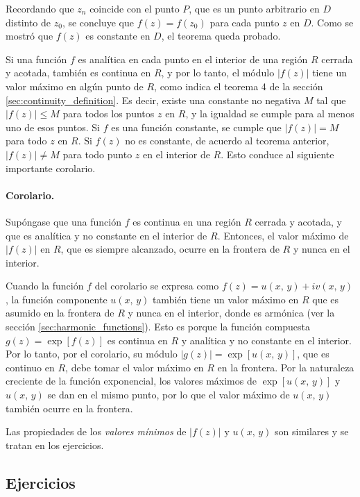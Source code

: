 \documentclass[a4paper]{report}
\begin{document}
Recordando que \(z_n\) coincide con el punto \(P\), que es un punto arbitrario en \(D\) distinto de \(z_0\), se concluye que \(f(z)=f(z_0)\) para cada punto \(z\) en \(D\). Como se mostró que \(f(z)\) es constante en \(D\), el teorema queda probado.

Si una función \(f\) es analítica en cada punto en el interior de una región \(R\) cerrada y acotada, también es continua en \(R\), y por lo tanto, el módulo \(|f(z)|\) tiene un valor máximo en algún punto de \(R\), como indica el teorema 4 de la sección \ref{sec:continuity_definition}. Es decir, existe una constante no negativa \(M\) tal que \(|f(z)|\leq M\) para todos los puntos \(z\) en \(R\), y la igualdad se cumple para al menos uno de esos puntos. Si \(f\) es una función constante, se cumple que \(|f(z)|=M\) para todo \(z\) en \(R\). Si \(f(z)\) no es constante, de acuerdo al teorema anterior, \(|f(z)|\neq M\) para todo punto \(z\) en el interior de \(R\). Esto conduce al siguiente importante corolario.

\paragraph{Corolario.} Supóngase que una función \(f\) es continua en una región \(R\) cerrada y acotada, y que es analítica y no constante en el interior de \(R\). Entonces, el valor máximo de \(|f(z)|\) en \(R\), que es siempre alcanzado, ocurre en la frontera de \(R\) y nunca en el interior.

Cuando la función \(f\) del corolario se expresa como \(f(z)=u(x,\,y)+iv(x,\,y)\), la función componente \(u(x,\,y)\) también tiene un valor máximo en \(R\) que es asumido en la frontera de \(R\) y nunca en el interior, donde es armónica (ver la sección \ref{sec:harmonic_functions}). Esto es porque la función compuesta \(g(z)=\exp[f(z)]\) es continua en \(R\) y analítica y no constante en el interior. Por lo tanto, por el corolario, su módulo \(|g(z)|=\exp[u(x,\,y)]\), que es continuo en \(R\), debe tomar el valor máximo en \(R\) en la frontera. Por la naturaleza creciente de la función exponencial, los valores máximos de \(\exp[u(x,\,y)]\) y \(u(x,\,y)\) se dan en el mismo punto, por lo que el valor máximo de \(u(x,\,y)\) también ocurre en la frontera.

Las propiedades de los \emph{valores mínimos} de \(|f(z)|\)  y \(u(x,\,y)\) son similares y se tratan en los ejercicios.


\subsection*{Ejercicios}
\end{document}
